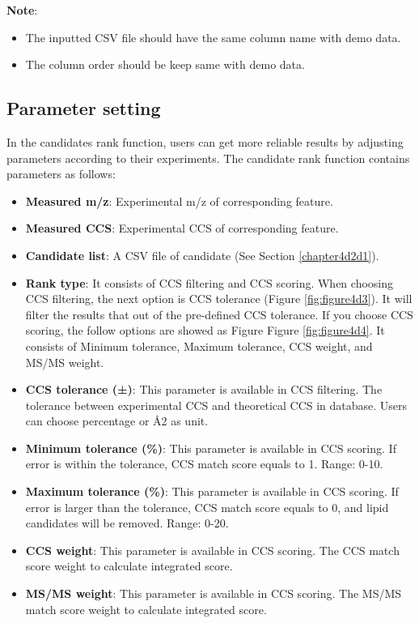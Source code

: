 \documentclass[12pt,]{book}
\providecommand{\tightlist}{%
  \setlength{\itemsep}{0pt}\setlength{\parskip}{0pt}}
\begin{document}
\textbf{Note}:

\begin{itemize}
\tightlist
\item
  The inputted CSV file should have the same column name with demo data.
\item
  The column order should be keep same with demo data.
\end{itemize}

\subsection{Parameter setting}\label{chapter4d2d2}

In the candidates rank function, users can get more reliable results by
adjusting parameters according to their experiments. The candidate rank
function contains parameters as follows:

\begin{itemize}
\tightlist
\item
  \textbf{Measured m/z}: Experimental m/z of corresponding feature.
\item
  \textbf{Measured CCS}: Experimental CCS of corresponding feature.
\item
  \textbf{Candidate list}: A CSV file of candidate (See Section
  \ref{chapter4d2d1}).
\item
  \textbf{Rank type}: It consists of CCS filtering and CCS scoring. When
  choosing CCS filtering, the next option is CCS tolerance (Figure
  \ref{fig:figure4d3}). It will filter the results that out of the
  pre-defined CCS tolerance. If you choose CCS scoring, the follow
  options are showed as Figure Figure \ref{fig:figure4d4}. It consists
  of Minimum tolerance, Maximum tolerance, CCS weight, and MS/MS weight.
\item
  \textbf{CCS tolerance (±)}: This parameter is available in CCS
  filtering. The tolerance between experimental CCS and theoretical CCS
  in database. Users can choose percentage or Å2 as unit.
\item
  \textbf{Minimum tolerance (\%)}: This parameter is available in CCS
  scoring. If error is within the tolerance, CCS match score equals to
  1. Range: 0-10.
\item
  \textbf{Maximum tolerance (\%)}: This parameter is available in CCS
  scoring. If error is larger than the tolerance, CCS match score equals
  to 0, and lipid candidates will be removed. Range: 0-20.
\item
  \textbf{CCS weight}: This parameter is available in CCS scoring. The
  CCS match score weight to calculate integrated score.
\item
  \textbf{MS/MS weight}: This parameter is available in CCS scoring. The
  MS/MS match score weight to calculate integrated score.
\end{itemize}
\end{document}
